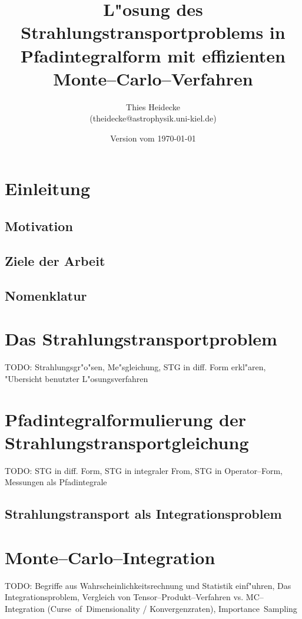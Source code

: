 \documentclass[11pt,a4paper]{scrartcl}
\begin{document}
	\title{L"osung des Strahlungstransportproblems in Pfadintegralform mit effizienten Monte--Carlo--Verfahren}
	\author{Thies Heidecke\\(theidecke@astrophysik.uni-kiel.de)}
	\date{Version vom \today}
	\maketitle
	
	\pagebreak
	
	\section{Einleitung}
	\subsection{Motivation}
	\subsection{Ziele der Arbeit}
	\subsection{Nomenklatur}
	
	\section{Das Strahlungstransportproblem}
	TODO: Strahlungsgr"o"sen, Me"sgleichung, STG in diff. Form erkl"aren, "Ubersicht benutzter L"osungsverfahren
	
	\section{Pfadintegralformulierung der Strahlungstransportgleichung}
	TODO: STG in diff. Form, STG in integraler From, STG in Operator--Form, Messungen als Pfadintegrale
	\subsection{Strahlungstransport als Integrationsproblem}
	\section{Monte--Carlo--Integration}
	TODO: Begriffe aus Wahrscheinlichkeitsrechnung und Statistik einf"uhren, Das Integrationsproblem, Vergleich von Tensor--Produkt--Verfahren vs. MC--Integration (Curse~of~Dimensionality / Konvergenzraten), Importance~Sampling
\end{document}
